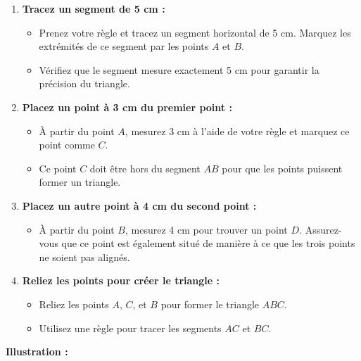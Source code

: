 \documentclass{article}
\begin{document}
\begin{enumerate}
    \item \textbf{Tracez un segment de 5 cm :}
    \begin{itemize}
        \item Prenez votre règle et tracez un segment horizontal de 5 cm. Marquez les extrémités de ce segment par les points \(A\) et \(B\).
        \item Vérifiez que le segment mesure exactement 5 cm pour garantir la précision du triangle.
    \end{itemize}

    \item \textbf{Placez un point à 3 cm du premier point :}
    \begin{itemize}
        \item À partir du point \(A\), mesurez 3 cm à l'aide de votre règle et marquez ce point comme \(C\). 
        \item Ce point \(C\) doit être hors du segment \(AB\) pour que les points puissent former un triangle.
    \end{itemize}

    \item \textbf{Placez un autre point à 4 cm du second point :}
    \begin{itemize}
        \item À partir du point \(B\), mesurez 4 cm pour trouver un point \(D\). Assurez-vous que ce point est également situé de manière à ce que les trois points ne soient pas alignés.
    \end{itemize}

    \item \textbf{Reliez les points pour créer le triangle :}
    \begin{itemize}
        \item Reliez les points \(A\), \(C\), et \(B\) pour former le triangle \(ABC\).
        \item Utilisez une règle pour tracer les segments \(AC\) et \(BC\).
    \end{itemize}
\end{enumerate}

\textbf{Illustration :}
\begin{tcolorbox}[colback=blue!10!white, colframe=blue!75!black, title=\textcolor{white}{Illustration}, sharp corners=south]
    \begin{center}
    \end{center}
\end{tcolorbox}
\end{document}
